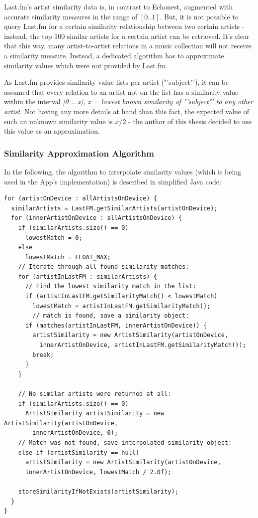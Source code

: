 Last.fm's artist similarity data is, in contrast to Echonest, augmented with accurate similarity measures in the range of $[0 .. 1]$. But, it is not possible to query Last.fm for a certain similarity relationship between two certain artists - instead, the top 100 similar artists for a certain artist can be retrieved. It's clear that this way, many artist-to-artist relations in a music collection will not receive a similarity measure. Instead, a dedicated algorithm has to approximate similarity values which were not provided by Last.fm.

As Last.fm provides similarity value lists per artist ("'subject"'), it can be assumed that every relation to an artist not on the list has a similarity value within the interval \emph{[0 .. x], x = lowest known similarity of "'subject"' to any other artist}. Not having any more details at hand than this fact, the expected value of such an unknown similarity value is $x / 2$ - the author of this thesis decided to use this value as an approximation.

\subsubsection{Similarity Approximation Algorithm}

In the following, the algorithm to interpolate similarity values (which is being used in the App's implementation) is described in simplified Java code:

\begin{verbatim}
for (artistOnDevice : allArtistsOnDevice) {
  similarArtists = LastFM.getSimilarArtists(artistOnDevice);
  for (innerArtistOnDevice : allArtistsOnDevice) {
    if (similarArtists.size() == 0)
      lowestMatch = 0;
    else
      lowestMatch = FLOAT_MAX;
    // Iterate through all found similarity matches:
    for (artistInLastFM : similarArtists) {
      // Find the lowest similarity match in the list:
      if (artistInLastFM.getSimilarityMatch() < lowestMatch)
        lowestMatch = artistInLastFM.getSimilarityMatch();
        // match is found, save a similarity object:
      if (matches(artistInLastFM, innerArtistOnDevice)) {
        artistSimilarity = new ArtistSimilarity(artistOnDevice, 
          innerArtistOnDevice, artistInLastFM.getSimilarityMatch());
        break;
      }
    }
	
    // No similar artists were returned at all:
    if (similarArtists.size() == 0)
      ArtistSimilarity artistSimilarity = new ArtistSimilarity(artistOnDevice, 
        innerArtistOnDevice, 0);    
    // Match was not found, save interpolated similarity object:
    else if (artistSimilarity == null)
      artistSimilarity = new ArtistSimilarity(artistOnDevice, 
      innerArtistOnDevice, lowestMatch / 2.0f);

    storeSimilarityIfNotExists(artistSimilarity);
  }
}	            
	
\end{verbatim}

